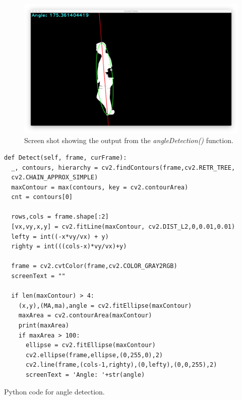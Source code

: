 \documentclass[11pt,a4paper]{report}
\begin{document}
\begin{figure}[H]
 \centering
 \includegraphics[scale = 0.22]{angleExample.png}
 \caption{Screen shot showing the output from the \textit{angleDetection()} function.}
 \label{fig:angleDetectionExample}
\end{figure}

\begin{listing}
\begin{verbatim}
def Detect(self, frame, curFrame):
  _, contours, hierarchy = cv2.findContours(frame,cv2.RETR_TREE,
  cv2.CHAIN_APPROX_SIMPLE)
  maxContour = max(contours, key = cv2.contourArea)
  cnt = contours[0]

  rows,cols = frame.shape[:2]
  [vx,vy,x,y] = cv2.fitLine(maxContour, cv2.DIST_L2,0,0.01,0.01)
  lefty = int((-x*vy/vx) + y)
  righty = int(((cols-x)*vy/vx)+y)

  frame = cv2.cvtColor(frame,cv2.COLOR_GRAY2RGB)
  screenText = ""

  if len(maxContour) > 4:
    (x,y),(MA,ma),angle = cv2.fitEllipse(maxContour)
    maxArea = cv2.contourArea(maxContour)
    print(maxArea)
    if maxArea > 100:
      ellipse = cv2.fitEllipse(maxContour)
      cv2.ellipse(frame,ellipse,(0,255,0),2)
      cv2.line(frame,(cols-1,righty),(0,lefty),(0,0,255),2)
      screenText = 'Angle: '+str(angle)
\end{verbatim}
\caption{Python code for angle detection.}
\label{angleDetectionPython}
\end{listing}
\end{document}
